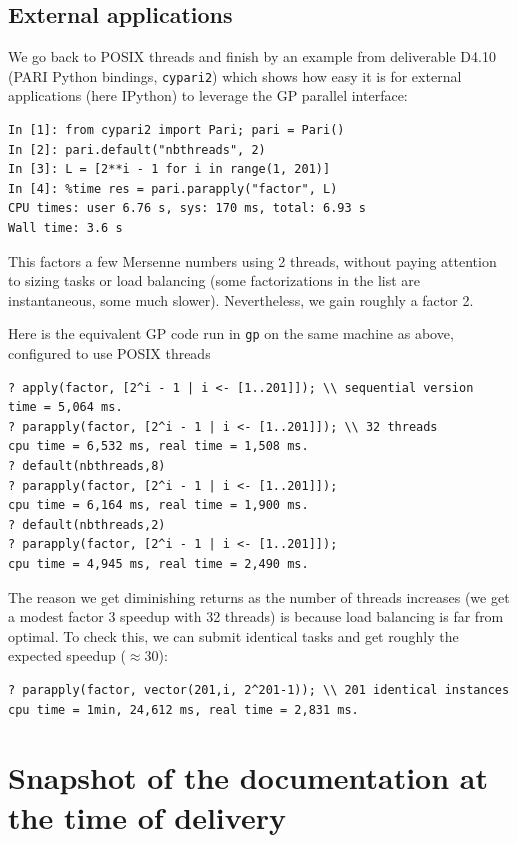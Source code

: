 \documentclass{deliverablereport}
\begin{document}
\subsection{External applications}

We go back to POSIX threads and finish by an example from deliverable D4.10
(PARI Python bindings, \texttt{cypari2}) which shows how easy it is for
external applications (here IPython) to leverage the GP parallel interface:

\begin{verbatim}
In [1]: from cypari2 import Pari; pari = Pari()
In [2]: pari.default("nbthreads", 2)
In [3]: L = [2**i - 1 for i in range(1, 201)]
In [4]: %time res = pari.parapply("factor", L)
CPU times: user 6.76 s, sys: 170 ms, total: 6.93 s
Wall time: 3.6 s
\end{verbatim}

This factors a few Mersenne numbers using 2 threads, without paying attention
to sizing tasks or load balancing (some factorizations in the list are
instantaneous, some much slower). Nevertheless, we gain roughly a factor 2.

Here is the equivalent GP code run in \texttt{gp} on the same machine
as above, configured to use POSIX threads
\begin{verbatim}
? apply(factor, [2^i - 1 | i <- [1..201]]); \\ sequential version
time = 5,064 ms.
? parapply(factor, [2^i - 1 | i <- [1..201]]); \\ 32 threads
cpu time = 6,532 ms, real time = 1,508 ms.
? default(nbthreads,8)
? parapply(factor, [2^i - 1 | i <- [1..201]]);
cpu time = 6,164 ms, real time = 1,900 ms.
? default(nbthreads,2)
? parapply(factor, [2^i - 1 | i <- [1..201]]);
cpu time = 4,945 ms, real time = 2,490 ms.
\end{verbatim}
The reason we get diminishing returns as the number of threads increases
(we get a modest factor 3 speedup with 32 threads) is because load balancing
is far from optimal. To check this, we can submit identical tasks and get
roughly the expected speedup ($\approx 30$):
\begin{verbatim}
? parapply(factor, vector(201,i, 2^201-1)); \\ 201 identical instances
cpu time = 1min, 24,612 ms, real time = 2,831 ms.
\end{verbatim}
\bigskip
\bigskip

\appendix
\section{Snapshot of the documentation at the time of delivery}


\end{document}
